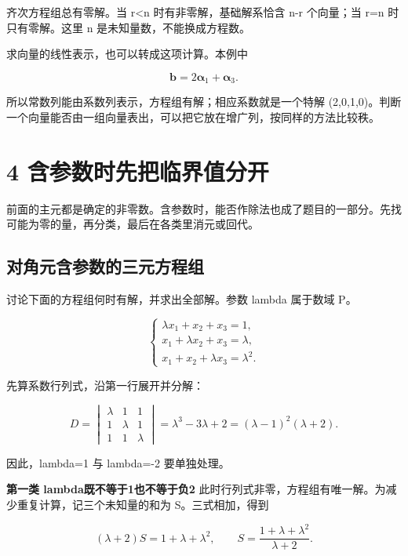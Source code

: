 \documentclass[
  11pt,
  a4paper,
  fontset=fandol]{ctexart}
\begin{document}
齐次方程组总有零解。当 r\textless n 时有非零解，基础解系恰含 n-r
个向量；当 r=n 时只有零解。这里 n 是未知量数，不能换成方程数。

求向量的线性表示，也可以转成这项计算。本例中

\[\boldsymbol b=2\boldsymbol\alpha_1+\boldsymbol\alpha_3.\]

所以常数列能由系数列表示，方程组有解；相应系数就是一个特解
(2,0,1,0)。判断一个向量能否由一组向量表出，可以把它放在增广列，按同样的方法比较秩。


\section{4
含参数时先把临界值分开}\label{4-ux542bux53c2ux6570ux65f6ux5148ux628aux4e34ux754cux503cux5206ux5f00}

前面的主元都是确定的非零数。含参数时，能否作除法也成了题目的一部分。先找可能为零的量，再分类，最后在各类里消元或回代。


\subsection{对角元含参数的三元方程组}\label{ux5bf9ux89d2ux5143ux542bux53c2ux6570ux7684ux4e09ux5143ux65b9ux7a0bux7ec4}

讨论下面的方程组何时有解，并求出全部解。参数 lambda 属于数域 P。

\[\begin{cases}
\lambda x_1+x_2+x_3=1,\\
x_1+\lambda x_2+x_3=\lambda,\\
x_1+x_2+\lambda x_3=\lambda^2.
\end{cases}\]

先算系数行列式，沿第一行展开并分解：

\[D=\begin{vmatrix}\lambda&1&1\\1&\lambda&1\\1&1&\lambda\end{vmatrix}
=\lambda^3-3\lambda+2=(\lambda-1)^2(\lambda+2).\]

因此，lambda=1 与 lambda=-2 要单独处理。

\textbf{第一类 lambda既不等于1也不等于负2}
此时行列式非零，方程组有唯一解。为减少重复计算，记三个未知量的和为
S。三式相加，得到

\[(\lambda+2)S=1+\lambda+\lambda^2,
\qquad S=\frac{1+\lambda+\lambda^2}{\lambda+2}.\]
\end{document}
